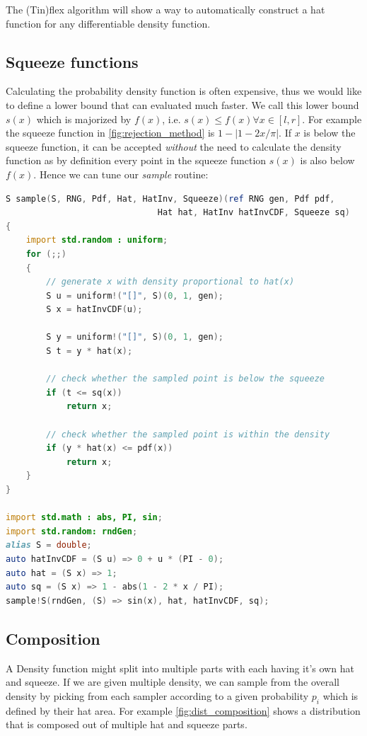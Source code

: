 The (Tin)flex algorithm will show a way to automatically construct a hat function for any differentiable density function.

\subsection{Squeeze functions}

Calculating the probability density function is often expensive, thus we would like to define a lower bound that can evaluated much faster. We call this lower bound $s(x)$ which is majorized by $f(x)$, i.e. $s(x) \leq f(x) \forall x \in [l, r]$. For example the squeeze function in \autoref{fig:rejection_method} is $1 - |1 - 2x / \pi |$. If $x$ is below the squeeze function, it can be accepted \textit{without} the need to calculate the density function as by definition every point in the squeeze function $s(x)$ is also below $f(x)$. Hence we can tune our \textit{sample} routine:

\begin{minipage}{0.9\linewidth}
\begin{lstlisting}[language=D]
S sample(S, RNG, Pdf, Hat, HatInv, Squeeze)(ref RNG gen, Pdf pdf,
                              Hat hat, HatInv hatInvCDF, Squeeze sq)
{
    import std.random : uniform;
    for (;;)
    {
        // generate x with density proportional to hat(x)
        S u = uniform!("[]", S)(0, 1, gen);
        S x = hatInvCDF(u);

        S y = uniform!("[]", S)(0, 1, gen);
        S t = y * hat(x);

        // check whether the sampled point is below the squeeze
        if (t <= sq(x))
            return x;

        // check whether the sampled point is within the density
        if (y * hat(x) <= pdf(x))
            return x;
    }
}

import std.math : abs, PI, sin;
import std.random: rndGen;
alias S = double;
auto hatInvCDF = (S u) => 0 + u * (PI - 0);
auto hat = (S x) => 1;
auto sq = (S x) => 1 - abs(1 - 2 * x / PI);
sample!S(rndGen, (S) => sin(x), hat, hatInvCDF, sq);
\end{lstlisting}
\end{minipage}


\subsection{Composition}

A Density function might split into multiple parts with each having it's own hat and squeeze. If we are given multiple density, we can sample from the overall density by picking from each sampler according to a given probability $p_i$ which is defined by their hat area. For example \autoref{fig:dist_composition} shows a distribution that is composed out of multiple hat and squeeze parts.


